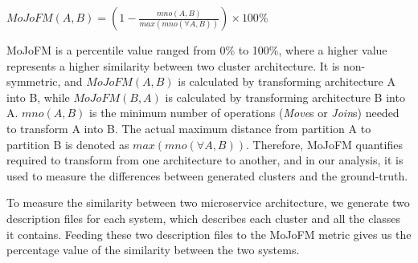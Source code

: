 $MoJoFM(A, B) = (1 - \frac{mno(A, B)}{max(mno(\forall A, B))}) \times 100\%$

MoJoFM is a percentile value ranged from 0\% to 100\%, where a higher value represents a higher similarity between two cluster architecture. It is non-symmetric, and $MoJoFM(A, B)$ is calculated by transforming architecture A into B, while $MoJoFM(B, A)$ is calculated by transforming architecture B into A. $mno(A, B)$ is the minimum number of operations (\textit{Move}s or \textit{Join}s) needed to transform A into B. The actual maximum distance from partition A to partition B is denoted as $max(mno(\forall A, B))$. Therefore, MoJoFM quantifies required to transform from one architecture to another, and in our analysis, it is used to measure the differences between generated clusters and the ground-truth.

To measure the similarity between two microservice architecture, we generate two description files for each system, which describes each cluster and all the classes it contains. Feeding these two description files to the MoJoFM metric gives us the percentage value of the similarity between the two systems.


